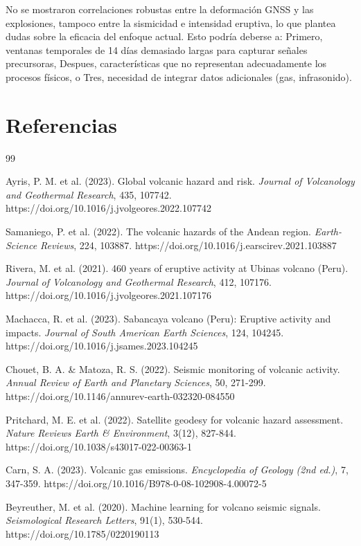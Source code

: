 \documentclass[11pt, a4paper, twocolumn]{article}  %
\begin{document}
No se mostraron correlaciones robustas entre la deformación GNSS y las explosiones, tampoco entre la sismicidad e intensidad eruptiva, lo que plantea dudas sobre la eficacia del enfoque actual. Esto podría deberse a: Primero, ventanas temporales de 14 días demasiado largas para capturar señales precursoras, Despues, características que no representan adecuadamente los procesos físicos, o Tres, necesidad de integrar datos adicionales (gas, infrasonido).

\renewcommand{\refname}{}
\section{Referencias}
\begin{thebibliography}{99}

Ayris, P. M. et al. (2023). Global volcanic hazard and risk. \textit{Journal of Volcanology and Geothermal Research}, 435, 107742. https://doi.org/10.1016/j.jvolgeores.2022.107742

Samaniego, P. et al. (2022). The volcanic hazards of the Andean region. \textit{Earth-Science Reviews}, 224, 103887. https://doi.org/10.1016/j.earscirev.2021.103887

Rivera, M. et al. (2021). 460 years of eruptive activity at Ubinas volcano (Peru). \textit{Journal of Volcanology and Geothermal Research}, 412, 107176. https://doi.org/10.1016/j.jvolgeores.2021.107176

Machacca, R. et al. (2023). Sabancaya volcano (Peru): Eruptive activity and impacts. \textit{Journal of South American Earth Sciences}, 124, 104245. https://doi.org/10.1016/j.jsames.2023.104245

Chouet, B. A. \& Matoza, R. S. (2022). Seismic monitoring of volcanic activity. \textit{Annual Review of Earth and Planetary Sciences}, 50, 271-299. https://doi.org/10.1146/annurev-earth-032320-084550

Pritchard, M. E. et al. (2022). Satellite geodesy for volcanic hazard assessment. \textit{Nature Reviews Earth \& Environment}, 3(12), 827-844. https://doi.org/10.1038/s43017-022-00363-1

Carn, S. A. (2023). Volcanic gas emissions. \textit{Encyclopedia of Geology (2nd ed.)}, 7, 347-359. https://doi.org/10.1016/B978-0-08-102908-4.00072-5

Beyreuther, M. et al. (2020). Machine learning for volcano seismic signals. \textit{Seismological Research Letters}, 91(1), 530-544. https://doi.org/10.1785/0220190113


\end{thebibliography}
\end{document}

